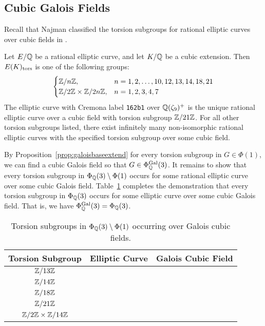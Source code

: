 \subsection{Cubic Galois Fields}

Recall that Najman classified the torsion subgroups for rational elliptic curves over cubic fields in \cite{najman16}.


\begin{thm}
Let $E/\mathbb{Q}$ be a rational elliptic curve, and let $K/\mathbb{Q}$ be a cubic extension. Then $E(K)_{\text{tors}}$ is one of the following groups:
	\[
	\begin{cases}
	\mathbb{Z}/n\mathbb{Z}, & n= 1,2 ,\ldots, 10, 12, 13, 14, 18, 21 \\
	\mathbb{Z}/2\mathbb{Z} \times \mathbb{Z}/2n\mathbb{Z}, & n= 1, 2, 3, 4, 7
	\end{cases}
	\]
The elliptic curve with Cremona label \texttt{162b1} over $\mathbb{Q}(\zeta_9)^+$ is the unique rational elliptic curve over a cubic field with torsion subgroup $\mathbb{Z}/21\mathbb{Z}$. For all other torsion subgroups listed, there exist infinitely many non-isomorphic rational elliptic curves with the specified torsion subgroup over some cubic field. 
\end{thm}


By Proposition~\ref{prop:galoisbaseextend} for every torsion subgroup in $G \in \Phi(1)$, we can find a cubic Galois field so that $G \in \Phi_{\mathbb{Q}}^{\operatorname{Gal}}(3)$. It remains to show that every torsion subgroup in $\Phi_{\mathbb{Q}}(3) \setminus \Phi(1)$ occurs for some rational elliptic curve over some cubic Galois field. Table~\ref{tab:cubicgaloisoddex} completes the demonstration that every torsion subgroup in $\Phi_{\mathbb{Q}}(3)$ occurs for some elliptic curve over some cubic Galois field. That is, we have $\Phi_{\mathbb{Q}}^{\operatorname{Gal}}(3)= \Phi_{\mathbb{Q}}(3)$. 


	\begin{table}[!ht]
	\centering
	\caption{Torsion subgroups in $\Phi_{\mathbb{Q}}(3) \setminus \Phi(1)$ occurring over Galois cubic fields.\label{tab:cubicgaloisoddex}}
	\begin{tabular}{ccc} \hline
	Torsion Subgroup & Elliptic Curve & Galois Cubic Field \\ \hline
	$\mathbb{Z}/13\mathbb{Z}$ & \ofsbo{} & \qzetasp{} \\
	$\mathbb{Z}/14\mathbb{Z}$ & \fnat{} & \qzetasp{} \\
	$\mathbb{Z}/18\mathbb{Z}$ & \ofaf{} & \qzetasp{} \\
	$\mathbb{Z}/21\mathbb{Z}$ & \ostbo{} & \qzetanp{} \\
	$\mathbb{Z}/2\mathbb{Z} \times \mathbb{Z}/14\mathbb{Z}$ & \onttco{} & \ttnsoo{}
	\end{tabular}
	\end{table}






